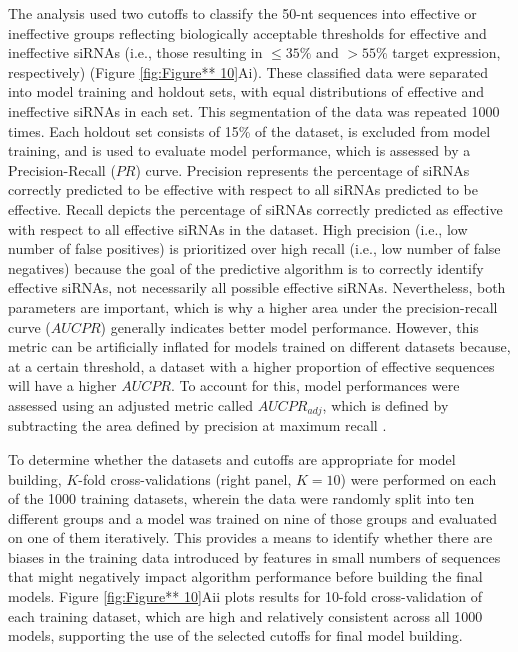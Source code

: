 \documentclass{report}
\begin{document}
The analysis used two cutoffs to classify the 50-nt sequences into effective or ineffective groups reflecting biologically acceptable thresholds for effective and ineffective siRNAs (i.e., those resulting in $\leq35\%$ and $>55\%$ target expression, respectively) (Figure \ref{fig:Figure** 10}Ai). These classified data were separated into model training and holdout sets, with equal distributions of effective and ineffective siRNAs in each set. This segmentation of the data was repeated 1000 times. Each holdout set consists of 15\% of the dataset, is excluded from model training, and is used to evaluate model performance, which is assessed by a Precision-Recall ($PR$) curve. Precision represents the percentage of siRNAs correctly predicted to be effective with respect to all siRNAs predicted to be effective. Recall depicts the percentage of siRNAs correctly predicted as effective with respect to all effective siRNAs in the dataset. High precision (i.e., low number of false positives) is prioritized over high recall (i.e., low number of false negatives) because the goal of the predictive algorithm is to correctly identify effective siRNAs, not necessarily all possible effective siRNAs. Nevertheless, both parameters are important, which is why a higher area under the precision-recall curve ($AUCPR$) generally indicates better model performance. However, this metric can be artificially inflated for models trained on different datasets because, at a certain threshold, a dataset with a higher proportion of effective sequences will have a higher $AUCPR$. To account for this, model performances were assessed using an adjusted metric called $AUCPR_{adj}$, which is defined by subtracting the area defined by precision at maximum recall \cite{monopoli_asymmetric_2023}.

To determine whether the datasets and cutoffs are appropriate for model building, $K$-fold cross-validations (right panel, $K=10$) were performed on each of the 1000 training datasets, wherein the data were randomly split into ten different groups and a model was trained on nine of those groups and evaluated on one of them iteratively. This provides a means to identify whether there are biases in the training data introduced by features in small numbers of sequences that might negatively impact algorithm performance before building the final models. Figure \ref{fig:Figure** 10}Aii plots results for 10-fold cross-validation of each training dataset, which are high and relatively consistent across all 1000 models, supporting the use of the selected cutoffs for final model building.
\end{document}
